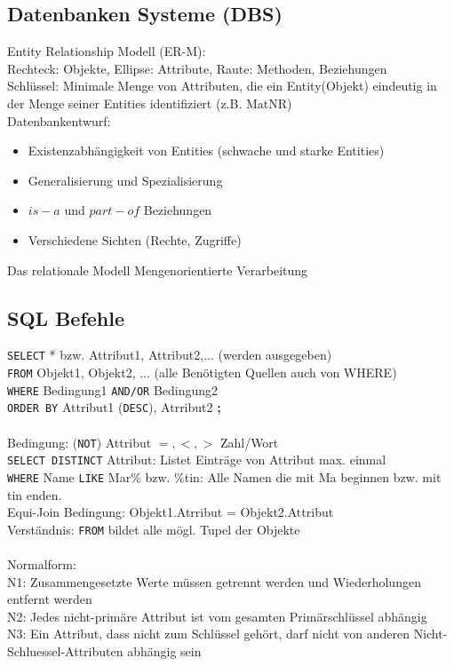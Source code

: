 \documentclass[fs]{latex4ei}
\begin{document}
\begin{multicols}{4}
\subsection{Datenbanken Systeme (DBS)}
Entity Relationship Modell (ER-M):\\
Rechteck: Objekte, Ellipse: Attribute, Raute: Methoden, Beziehungen\\
Schlüssel: Minimale Menge von Attributen, die ein Entity(Objekt) eindeutig in der Menge seiner Entities identifiziert (z.B. MatNR)\\

Datenbankentwurf:\\
\begin{itemize}
	\item Existenzabhängigkeit von Entities (schwache und starke Entities)
	\item Generalisierung und Spezialisierung
	\item $is-a$ und $part-of$ Beziehungen
	\item Verschiedene Sichten (Rechte, Zugriffe)
\end{itemize}

Das relationale Modell
Mengenorientierte Verarbeitung


\subsection{SQL Befehle}
\texttt{SELECT} * bzw. Attribut1, Attribut2,... (werden ausgegeben)\\
\texttt{FROM} Objekt1, Objekt2, ... (alle Benötigten Quellen auch von WHERE)\\
\texttt{WHERE} Bedingung1 \texttt{AND/OR} Bedingung2\\
\texttt{ORDER BY} Attribut1 (\texttt{DESC}), Atrribut2 \textbf{\large ;}\\
\\
Bedingung: (\texttt{NOT}) Attribut $=,<,>$ Zahl/\dq{}Wort\dq{}\\
\texttt{SELECT DISTINCT} Attribut: Listet Einträge von Attribut max. einmal\\
\texttt{WHERE} Name \texttt{LIKE} \dq{}Mar\%\dq{} bzw. \dq{}\%{}tin\dq: Alle Namen die mit \dq{}Ma\dq{} beginnen bzw. mit \dq{}tin\dq{} enden.\\
Equi-Join Bedingung: Objekt1.Atrribut = Objekt2.Attribut\\
Verständnis: \texttt{FROM} bildet alle mögl. Tupel der Objekte\\
\\
Normalform:\\
N1: Zusammengesetzte Werte müssen getrennt werden und Wiederholungen entfernt werden\\
N2: Jedes nicht-primäre Attribut ist vom gesamten Primärschlüssel abhängig\\
N3: Ein Attribut, dass nicht zum Schlüssel gehört, darf nicht von anderen Nicht-Schluessel-Attributen abhängig sein\\




\end{multicols}

\end{document}
